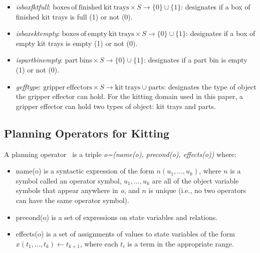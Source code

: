 \begin{small}
\begin{itemize}
\item \emph{isboxfktfull}: $\mathrm{boxes\ of\ finished\ kit\ trays}\times S\rightarrow \lbrace 0\rbrace \cup \lbrace 1\rbrace$: designates if a box of finished kit trays is full (1) or not (0).

\item \emph{isboxektempty}: $\mathrm{boxes\ of\ empty\ kit\ trays}\times S\rightarrow \lbrace 0\rbrace \cup \lbrace 1\rbrace$: designates if a box of empty kit trays is empty (1) or not (0).

\item \emph{ispartbinempty}: $\mathrm{part\ bins}\times S\rightarrow \lbrace 0\rbrace \cup \lbrace 1\rbrace$: designates if a part bin is empty (1) or not (0).

\item \emph{gefftype}: $ \mathrm{gripper\ effectors}\times S \rightarrow \mathrm{kit\ trays} \cup \mathrm{parts}$: designates the type of object the gripper effector can hold. For the kitting domain used in this paper, a gripper effector can hold two types of object: kit trays and parts.
\end{itemize}
\end{small}


\subsection{Planning Operators for Kitting}
A planning operator~\cite{NAU.2004} is a triple \textit{o=(name(o), precond(o), effects(o))}
where:
\begin{itemize}
\item name(o) is a syntactic expression of the form $n(u_1,\dots,u_k)$, where $n$ is a symbol
called an operator symbol, $u_1,\dots,u_k$ are all of the object variable symbols that
appear anywhere in \textit{o}, and $n$ is unique (i.e., no two operators can have the
same operator symbol).
\item precond(o) is a set of expressions on state variables and relations.
\item effects(o) is a set of assignments of values to state variables of the form
$x(t_1,\dots,t_k)\leftarrow t_{k+1}$, where each $t_i$ is a term in the appropriate range.
\end{itemize}

